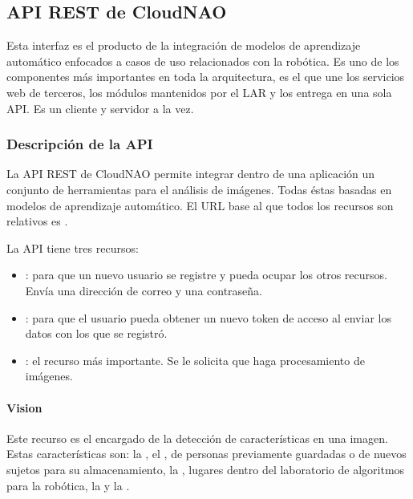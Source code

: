 

\subsection{API REST de CloudNAO}
\label{chapter_two/desc_cloudnao:api-rest-de-cloudnao}

Esta interfaz es el producto de la integración de modelos de aprendizaje
automático
enfocados a casos de uso relacionados con la robótica.
Es uno de los componentes más importantes en toda la arquitectura,
es el que une los servicios web de
terceros, los módulos mantenidos por el LAR y los entrega en una sola API.
Es un cliente y servidor a la vez.


\subsubsection{Descripción de la API}
\label{\detokenize{chapter_two/desc_cloudnao:documentacion-para-desarrolladores-clientes}}
La API REST de CloudNAO permite integrar dentro de una aplicación un
conjunto de herramientas para el análisis de imágenes.
Todas éstas basadas en modelos de aprendizaje automático. El URL base al
que todos los recursos son relativos es .

La API tiene tres recursos:
\begin{itemize}
\item {} 
: para que un nuevo usuario se registre y pueda ocupar los otros recursos. Envía una dirección de correo y una contraseña.

\item {} 
: para que el usuario pueda obtener un nuevo token de acceso al enviar los datos con los que se registró.

\item {} 
: el recurso más importante. Se le solicita que haga procesamiento de imágenes.

\end{itemize}

\paragraph{Vision}
\label{\detokenize{chapter_two/desc_cloudnao:vision}}
Este recurso es el encargado de la detección de características en una
imagen. Estas características son: la , el
, de personas previamente guardadas o de
nuevos sujetos para su almacenamiento, la , lugares
dentro del laboratorio de algoritmos para la robótica, la
y la .

